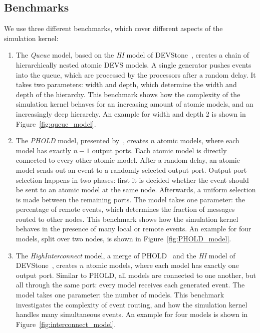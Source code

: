\subsection{Benchmarks}
We use three different benchmarks, which cover different aspects of the simulation kernel:
\begin{enumerate}
    \item The \textit{Queue} model, based on the \textit{HI} model of DEVStone~\cite{DEVStone}, creates a chain of hierarchically nested atomic \textsf{DEVS} models.
          A single generator pushes events into the queue, which are processed by the processors after a random delay.
          It takes two parameters: width and depth, which determine the width and depth of the hierarchy.
          This benchmark shows how the complexity of the simulation kernel behaves for an increasing amount of atomic models, and an increasingly deep hierarchy.
          An example for width and depth 2 is shown in Figure~\ref{fig:queue_model}.

    \item The \textit{PHOLD} model, presented by~\cite{PHOLD}, creates $n$ atomic models, where each model has exactly $n-1$ output ports.
          Each atomic model is directly connected to every other atomic model.
          After a random delay, an atomic model sends out an event to a randomly selected output port.
          Output port selection happens in two phases: first it is decided whether the event should be sent to an atomic model at the same node.
          Afterwards, a uniform selection is made between the remaining ports.
          The model takes one parameter: the percentage of remote events, which determines the fraction of messages routed to other nodes.
          This benchmark shows how the simulation kernel behaves in the presence of many local or remote events.
          An example for four models, split over two nodes, is shown in Figure~\ref{fig:PHOLD_model}.

    \item The \textit{HighInterconnect} model, a merge of PHOLD~\cite{PHOLD} and the \textit{HI} model of DEVStone~\cite{DEVStone}, creates $n$ atomic models, where each model has exactly one output port.
          Similar to PHOLD, all models are connected to one another, but all through the same port: every model receives each generated event.
          The model takes one parameter: the number of models.
          This benchmark investigates the complexity of event routing, and how the simulation kernel handles many simultaneous events.
          An example for four models is shown in Figure~\ref{fig:interconnect_model}.
\end{enumerate}

